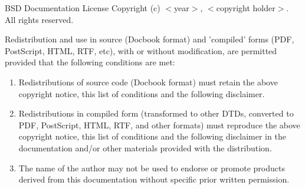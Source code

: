 \documentclass{beamer}
\begin{document}
\begin{frame}

\small

\begin{block}{BSD Documentation License} 
Copyright (c) $<$year$>$, $<$copyright holder$>$. All rights reserved. \\

\smallskip

Redistribution and use in source (Docbook format) and 'compiled' forms
(PDF, PostScript, HTML, RTF, etc), with or without modification, are
permitted provided that the following conditions are met:

\begin{enumerate}
\item Redistributions of source code (Docbook format) must retain the
above copyright notice, this list of conditions and the following
disclaimer.
\item Redistributions in compiled form (transformed to other DTDs,
converted to PDF, PostScript, HTML, RTF, and other formats) must
reproduce the above copyright notice, this list of conditions and the
following disclaimer in the documentation and/or other materials
provided with the distribution.
\item The name of the author may not be used to endorse or promote
products derived from this documentation without specific prior
written permission.
\end{enumerate}
 
\end{block}

\end{frame}

\end{document}
